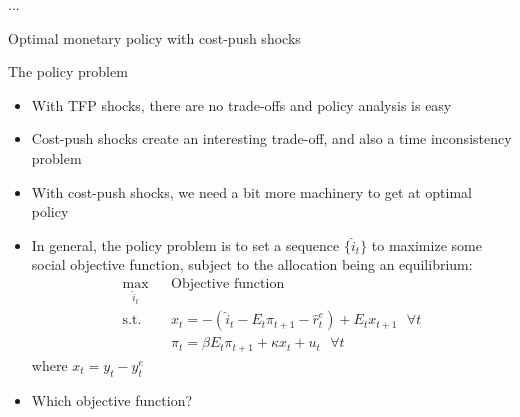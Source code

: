 \documentclass[9pt,xcolor={dvipsnames}]{beamer}
\newcommand{\bit}{\begin{itemize}}
\newcommand{\eit}{\end{itemize}}
\begin{document}
\begin{frame}{...}


\begin{center}
	\huge Optimal monetary policy with cost-push shocks \normalfont
\end{center}

\end{frame}


\begin{frame}{The policy problem}

\bit
\setlength\itemsep{1.5em}
\item With TFP shocks, there are no trade-offs and policy analysis is easy

\item Cost-push shocks create an interesting trade-off, and also a time inconsistency problem

\item With cost-push shocks, we need a bit more machinery to get at optimal policy

\item In general, the policy problem is to set a sequence $\{\hat i_t \}$ to maximize some social objective function, subject to the allocation being an equilibrium:
\begin{eqnarray}
\max_{\hat i_t} && \text{Objective function} \nonumber \\
\text{s.t. } &&  x_t = - (\hat i_t-E_t \pi_{t+1}-\hat r^e_t) + E_t x_{t+1} \text{  } \forall t \nonumber \\
&& \pi_t = \beta E_t \pi_{t+1} + \kappa x_t + u_t \text{  } \forall t \nonumber 
\end{eqnarray}
where $x_t = y_t - y^e_t$

\item Which objective function?

\eit

\end{frame}
\end{document}
